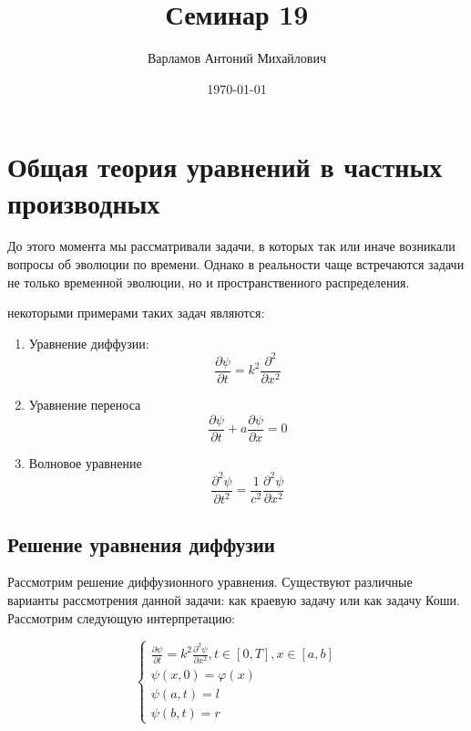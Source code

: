 \documentclass[10pt,a4paper]{article}
\title{Семинар 19}
\date{\today}
\author{Варламов Антоний Михайлович}
\begin{document}
	\maketitle
	
	\section{Общая теория уравнений в частных производных}
	
	До этого момента мы рассматривали задачи, в которых так или иначе возникали 
	вопросы об эволюции по времени. Однако в реальности чаще встречаются задачи 
	не только временной эволюции, но и пространственного распределения.
	
	некоторыми примерами таких задач являются:
	\begin{enumerate}
		\item Уравнение диффузии:
			\begin{equation}
				\frac{\partial \psi}{\partial t} = k^{2}\frac{\partial^{2}}
				{\partial x^{2}}
			\end{equation}
		\item Уравнение переноса
			\begin{equation}
				\frac{\partial \psi}{\partial t} + a\frac{\partial \psi}
				{\partial x} = 0
			\end{equation}
		\item Волновое уравнение
			\begin{equation}
				\frac{\partial^{2}\psi}{\partial t^{2}} = \frac{1}{c^{2}}
				\frac{\partial^{2}\psi}{\partial x^{2}}
			\end{equation}
	\end{enumerate}
	
	\subsection{Решение уравнения диффузии}
		
		Рассмотрим решение диффузионного уравнения. Существуют различные
		варианты рассмотрения данной задачи: как краевую задачу или как задачу 
		Коши.
		Рассмотрим следующую интерпретацию:
		
		\begin{equation}
			\begin{cases}
				\frac{\partial \psi}{\partial t} = k^{2}\frac{\partial^{2}\psi}
				{\partial x^{2}}, t \in \left[0, T\right], x \in \left[a, b
				\right]
				\\
				\psi\left(x, 0\right)   = \varphi\left(x\right)
				\\
				\psi\left(a, t\right) = l
				\\
				\psi\left(b, t\right) = r
			\end{cases}
		\end{equation}
		
\end{document}
